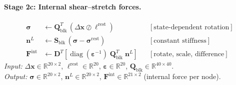 \documentclass[11pt]{article}
\newcommand{\vect}[1]{\mathbf{#1}}
\newcommand{\mat}[1]{\mathbf{#1}}
\newcommand{\Real}{\mathbb{R}}
\begin{document}
\paragraph{Stage 2c: Internal shear--stretch forces.}
\begin{equation}
  \boxed{\;
  \begin{aligned}
    \bm{\sigma} &\leftarrow \mat{Q}_{\text{blk}}^T\,(\Delta\vect{x} \oslash \bm{\ell}^{\text{rest}})
      && [\text{state-dependent rotation}] \\
    \vect{n}^L &\leftarrow \mat{S}_{\text{blk}}\,(\bm{\sigma} - \bm{\sigma}^{\text{rest}})
      && [\text{constant stiffness}] \\
    \vect{F}^{\text{int}} &\leftarrow \mat{D}^T\!\left[\operatorname{diag}(\bm{\varepsilon}^{-1}) \;\mat{Q}_{\text{blk}}^T\;\vect{n}^L\right]
      && [\text{rotate, scale, difference}]
  \end{aligned}
  \;}
  \label{eq:mat-shear-force}
\end{equation}
\textit{Input:} $\Delta\vect{x} \in \Real^{20 \times 2}$, $\bm{\ell}^{\text{rest}} \in \Real^{20}$, $\bm{\varepsilon} \in \Real^{20}$, $\mat{Q}_{\text{blk}} \in \Real^{40 \times 40}$. \\
\textit{Output:} $\bm{\sigma} \in \Real^{20 \times 2}$, $\vect{n}^L \in \Real^{20 \times 2}$, $\vect{F}^{\text{int}} \in \Real^{21 \times 2}$ (internal force per node).
\end{document}
